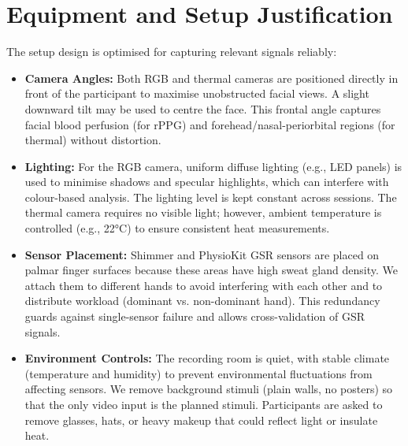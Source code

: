 \documentclass{article}
\begin{document}
\section{Equipment and Setup Justification}
The setup design is optimised for capturing relevant signals reliably:
\begin{itemize}
    \item \textbf{Camera Angles:} Both RGB and thermal cameras are positioned directly in front of the participant to maximise unobstructed facial views. A slight downward tilt may be used to centre the face. This frontal angle captures facial blood perfusion (for rPPG) and forehead/nasal-periorbital regions (for thermal) without distortion.
    \item \textbf{Lighting:} For the RGB camera, uniform diffuse lighting (e.g., LED panels) is used to minimise shadows and specular highlights, which can interfere with colour-based analysis. The lighting level is kept constant across sessions. The thermal camera requires no visible light; however, ambient temperature is controlled (e.g., 22°C) to ensure consistent heat measurements.
    \item \textbf{Sensor Placement:} Shimmer and PhysioKit GSR sensors are placed on palmar finger surfaces because these areas have high sweat gland density. We attach them to different hands to avoid interfering with each other and to distribute workload (dominant vs. non-dominant hand). This redundancy guards against single-sensor failure and allows cross-validation of GSR signals.
    \item \textbf{Environment Controls:} The recording room is quiet, with stable climate (temperature and humidity) to prevent environmental fluctuations from affecting sensors. We remove background stimuli (plain walls, no posters) so that the only video input is the planned stimuli. Participants are asked to remove glasses, hats, or heavy makeup that could reflect light or insulate heat.
\end{itemize}
\end{document}
